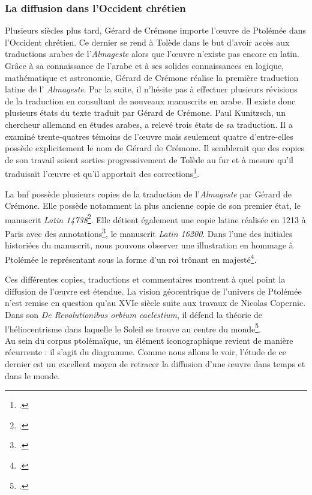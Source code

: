 \subsubsection{La diffusion dans l'Occident chrétien}
Plusieurs siècles plus tard, Gérard de Crémone importe l'œuvre de Ptolémée dans l'Occident chrétien. 
Ce dernier se rend à Tolède dans le but d'avoir accès aux traductions arabes de l'\textit{Almageste} alors que l'œuvre n'existe pas encore en latin. Grâce à sa connaissance de l'arabe et à ses solides connaissances en logique, mathématique et astronomie, Gérard de Crémone réalise la première traduction latine de l' \textit{Almageste}. Par la suite, il n'hésite pas à effectuer plusieurs révisions de la traduction en consultant de nouveaux manuscrits en arabe. Il existe donc plusieurs états du texte traduit par Gérard de Crémone. Paul Kunitzsch, un chercheur allemand en études arabes, a relevé trois états de sa traduction. Il a examiné trente-quatres témoins de l'œuvre mais seulement quatre d'entre-elles possède explicitement le nom de Gérard de Crémone. Il semblerait que des copies de son travail soient sorties progressivement de Tolède au fur et à mesure qu'il traduisait l'œuvre et qu'il apportait des corrections\footcite{jacquartTraductionsAuFil2018}.

La \gls{bnf} possède plusieurs copies de la traduction de l'\textit{Almageste} par Gérard de Crémone. Elle possède notamment la plus ancienne copie de son premier état, le manuscrit \textit{Latin 14738}\footcite{jacquartTraductionsAuFil2018}. Elle détient également une copie latine réalisée en 1213 à Paris avec des annotations\footcite{ptolemaeusPtolomeusAlmagestumTransl1213}, le manuscrit \textit{Latin 16200}. 
Dans l'une des initiales historiées du manuscrit, nous pouvons observer une illustration en hommage  à Ptolémée le représentant sous la forme d'un roi trônant en majesté\footcite{TraductionLatineLAlmageste}. 

Ces différentes copies, traductions et commentaires montrent à quel point la diffusion de l'œuvre est étendue. La vision géocentrique de l'univers de Ptolémée n'est remise en question qu'au XVIe siècle suite aux travaux de Nicolas Copernic. Dans son \textit{De Revolutionibus orbium caelestium}, il défend la théorie de l'héliocentrisme dans laquelle le Soleil se trouve au centre du monde\footcite{verdetHELIOCENTRISME2008}. \\

Au sein du corpus ptolémaïque, un élément iconographique revient de manière récurrente : il s'agit du diagramme. Comme nous allons le voir, l'étude de ce dernier est un excellent moyen de retracer la diffusion d'une œuvre dans temps et dans le monde.